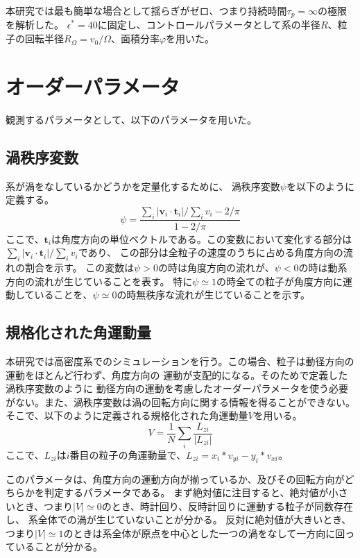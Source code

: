 \documentclass[/Users/ikedahajime/GitHub/reserch/master_report/thesis]{subfiles}
\begin{document}
本研究では最も簡単な場合として揺らぎがゼロ、つまり持続時間$\tau_p=\infty$の極限を解析した。
$\epsilon^*=40$に固定し、コントロールパラメータとして系の半径$R$、粒子の回転半径$R_\Omega=v_0/\Omega$、面積分率$\varphi$を用いた。


\section{オーダーパラメータ}
観測するパラメータとして、以下のパラメータを用いた。
\subsection{渦秩序変数}\label{subsec:vortes_order_parameter}
系が渦をなしているかどうかを定量化するために、
渦秩序変数$\psi$\cite{wiolandConfinementStabilizesBacterial2013}を以下のように定義する。
\begin{equation}\label{eq:def_psi}
    \psi=\frac{\sum_i \left|\bm{v}_i\cdot \bm{t}_i \right|/\sum_i v_i -2/\pi}{1-2/\pi}
\end{equation}
ここで、$\bm{t}_i$は角度方向の単位ベクトルである。この変数において変化する部分は
$\sum_i \left|\bm{v}_i\cdot \bm{t}_i \right|/\sum_i v_i$であり、
この部分は全粒子の速度のうちに占める角度方向の流れの割合を示す。
この変数は$\psi>0$の時は角度方向の流れが、$\psi<0$の時は動系方向の流れが生じていることを表す。
特に$\psi\simeq1$の時全ての粒子が角度方向に運動していることを、$\psi\simeq0$の時無秩序な流れが生じていることを示す。


\subsection{規格化された角運動量}
本研究では高密度系でのシミュレーションを行う。この場合、粒子は動径方向の運動をほとんど行わず、角度方向の
運動が支配的になる。そのためで定義した渦秩序変数のように
動径方向の運動を考慮したオーダーパラメータを使う必要がない。また、渦秩序変数は渦の回転方向に関する情報を得ることができない。
そこで、以下のように定義される規格化された角運動量$V$\cite{jiangEmergenceCollectiveDynamical2017,capriniCollectiveEffectsConfined2021}を用いる。
\begin{equation}
    V=\frac{1}{N} \sum_i \frac{L_{zi}}{ |L_{zi}|}
\end{equation}
ここで、$L_{zi}$は$i$番目の粒子の角運動量で、$L_{zi}=x_i*v_{yi}-y_i*v_{xi}$。


このパラメータは、角度方向の運動方向が揃っているか、及びその回転方向がどちらかを判定するパラメータである。
まず絶対値に注目すると、絶対値が小さいとき、つまり$|V|\simeq 0$のとき、時計回り、反時計回りに運動する粒子が同数存在し、
系全体での渦が生じていないことが分かる。
反対に絶対値が大きいとき、つまり$|V|\simeq 1$のときは系全体が原点を中心とした一つの渦をなして一方向に回っていることが分かる。
\end{document}
